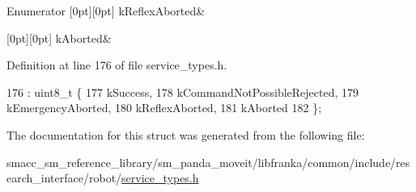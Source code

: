 \begin{DoxyEnumFields}{Enumerator}
[0pt][0pt]{}\mbox{\label{structresearch__interface_1_1robot_1_1StopMove_a74b1999fa778670f312087dd9acf231daedb741f9f460686f7d799eb503d047f1}} 
k\+Reflex\+Aborted&\\
\hline

[0pt][0pt]{}\mbox{\label{structresearch__interface_1_1robot_1_1StopMove_a74b1999fa778670f312087dd9acf231dac20d0424ae4484fda4424713f021d736}} 
k\+Aborted&\\
\hline

\end{DoxyEnumFields}


Definition at line 176 of file service\+\_\+types.\+h.


\begin{DoxyCode}
176                     : uint8\_t \{
177     kSuccess,
178     kCommandNotPossibleRejected,
179     kEmergencyAborted,
180     kReflexAborted,
181     kAborted
182   \};
\end{DoxyCode}


The documentation for this struct was generated from the following file\+:\begin{DoxyCompactItemize}
\item 
smacc\+\_\+sm\+\_\+reference\+\_\+library/sm\+\_\+panda\+\_\+moveit/libfranka/common/include/research\+\_\+interface/robot/\hyperlink{service__types_8h}{service\+\_\+types.\+h}\end{DoxyCompactItemize}

